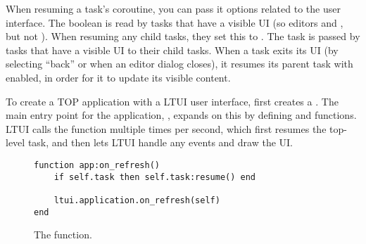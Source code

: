 When resuming a task's coroutine, you can pass it options related to the user interface. The boolean  is read by tasks that have a visible UI (so editors and , but not ). When resuming any child tasks, they set this to . The task  is passed by tasks that have a visible UI to their child tasks. When a task exits its UI (by selecting ``back'' or when an editor dialog closes), it resumes its parent task with  enabled, in order for it to update its visible content.

To create a TOP application with a LTUI user interface,  first creates a . The main entry point for the application, , expands on this by defining  and  functions. LTUI calls the  function multiple times per second, which first resumes the top-level task, and then lets LTUI handle any events and draw the UI.

\begin{figure}
\centering
{} %
\begin{verbatim}
function app:on_refresh()
	if self.task then self.task:resume() end
	
	ltui.application.on_refresh(self)
end
\end{verbatim}
\vspace{-\baselineskip}
\caption{The  function.}
\label{lst:ltasks_ltuiTest.on_refresh}
\end{figure}

